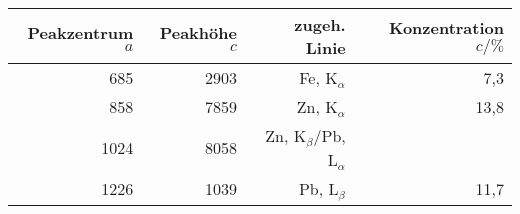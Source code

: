 \begin{tabular}{rrrr}
\toprule
Peakzentrum $a$ & Peakhöhe $c$ & zugeh. Linie & Konzentration $c/\%$ \\
\midrule
685 & 2903 & Fe, K$_{\alpha}$ & 7,3 \\
858 & 7859 & Zn, K$_{\alpha}$ & 13,8 \\
1024 & 8058 & Zn, K$_{\beta}$/Pb, L$_{\alpha}$ &  \\
1226 & 1039 & Pb, L$_{\beta}$ & 11,7 \\
\bottomrule
\end{tabular}
